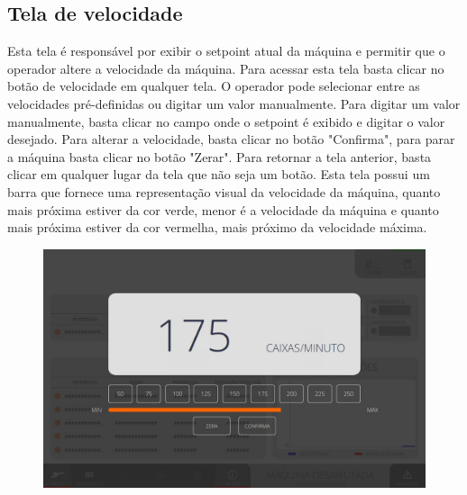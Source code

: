 \pagestyle{fancy}
\vspace*{40 pt}

\subsection{Tela de velocidade}
    Esta tela é responsável por exibir o setpoint atual da máquina e permitir que o operador altere a velocidade da máquina. Para acessar esta tela
    basta clicar no botão de velocidade em qualquer tela. O operador pode selecionar entre as velocidades pré-definidas ou digitar um valor manualmente.
    Para digitar um valor manualmente, basta clicar no campo onde o setpoint é exibido e digitar o valor desejado. Para alterar a velocidade, basta clicar no botão "Confirma",
    para parar a máquina basta clicar no botão "Zerar". Para retornar a tela anterior, basta clicar em qualquer lugar da tela que não seja um botão. Esta tela possui um 
    barra que fornece uma representação visual da velocidade da máquina, quanto mais próxima estiver da cor verde, menor é a velocidade da máquina e quanto mais próxima
    estiver da cor vermelha, mais próximo da velocidade máxima.
    \vspace*{\fill}
    \begin{figure}[h]
      \centering
      \includegraphics[width=576 px,height=360 px]{src/imagesFlexo/14-speedScreen/1.png}
    \end{figure}
    \vspace*{\fill}
    
    
    
